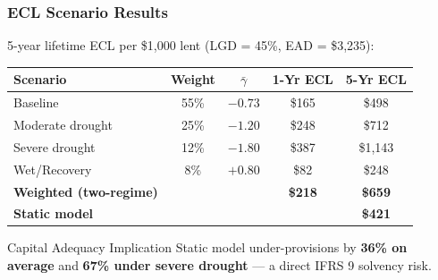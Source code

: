 \documentclass{beamer}
\begin{document}
\begin{frame}
    \frametitle{ECL Scenario Results}
    \vspace{0.1em}
    {\small 5-year lifetime ECL per \$1,000 lent (LGD = 45\%, EAD = \$3,235):}
    \vspace{0.2em}
    \begin{center}
    \begin{tabular}{@{}lcccc@{}}
        \toprule
        \textbf{Scenario} & \textbf{Weight} & \textbf{$\bar{\gamma}$} & \textbf{1-Yr ECL} & \textbf{5-Yr ECL} \\
        \midrule
        Baseline          & 55\% & $-0.73$ & \$165 & \$498 \\
        Moderate drought  & 25\% & $-1.20$ & \$248 & \$712 \\
        Severe drought    & 12\% & $-1.80$ & \$387 & \$1{,}143 \\
        Wet/Recovery      &  8\% & $+0.80$ & \$82  & \$248 \\
        \midrule
        \textbf{Weighted (two-regime)} & & & \textbf{\$218} & \textbf{\$659} \\
        \textbf{Static model}          & & & & \textbf{\$421} \\
        \bottomrule
    \end{tabular}
    \end{center}
    \vspace{0.2em}
    \begin{alertblock}{Capital Adequacy Implication}
        Static model under-provisions by \textbf{36\% on average} and \textbf{67\% under severe drought} --- a direct IFRS 9 solvency risk.
    \end{alertblock}
\end{frame}
\end{document}
